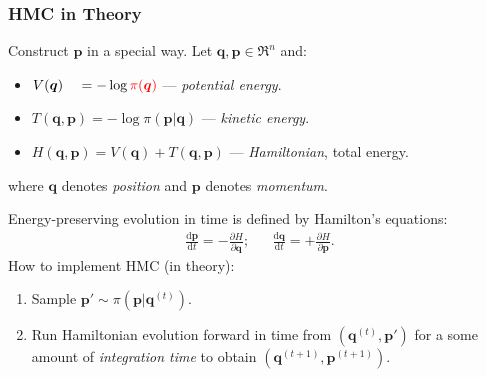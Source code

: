 \documentclass[xcolor=dvipsnames]{beamer}
\begin{document}
\begin{frame}
\frametitle{HMC in Theory}
Construct $\bm{p}$ in a special way. Let $\bm{q},\bm{p}\in \Re^n$ and:
\begin{itemize}
\item[] $V(\bm{q})\phantom{,\bm{p}} = -\log {\color{red}\pi(\bm{q})}$ --- \emph{potential energy}.
\item[] $T(\bm{q}, \bm{p}) = - \log \pi(\bm{p} | \bm{q})$ --- \emph{kinetic energy}.
\item[] $H(\bm{q}, \bm{p}) = V(\bm{q}) + T(\bm{q}, \bm{p})$ --- \emph{Hamiltonian}, total energy.
\end{itemize}
where $\bm{q}$ denotes \emph{position} and $\bm{p}$ denotes \emph{momentum}.

\vspace{0.3cm}

Energy-preserving evolution in time is defined by Hamilton's equations:
\begin{align*}
\frac{\mathrm{d}\bm{p}}{\mathrm{d} t} = - \frac{\partial H}{\partial \bm{q}}; && \frac{\mathrm{d}\bm{q}}{\mathrm{d} t} = + \frac{\partial H}{\partial \bm{p}}.
\end{align*}
How to implement HMC (in theory):
\begin{enumerate}
\item Sample $\bm{p}' \sim \pi(\bm{p}|\bm{q}^{(t)})$.
\item Run Hamiltonian evolution forward in time from $(\bm{q}^{(t)}, \bm{p}')$ for a some amount of {\color{red}\emph{integration time}} to obtain $(\bm{q}^{(t+1)}, \bm{p}^{(t+1)})$.
\end{enumerate}
\end{frame}
\end{document}
